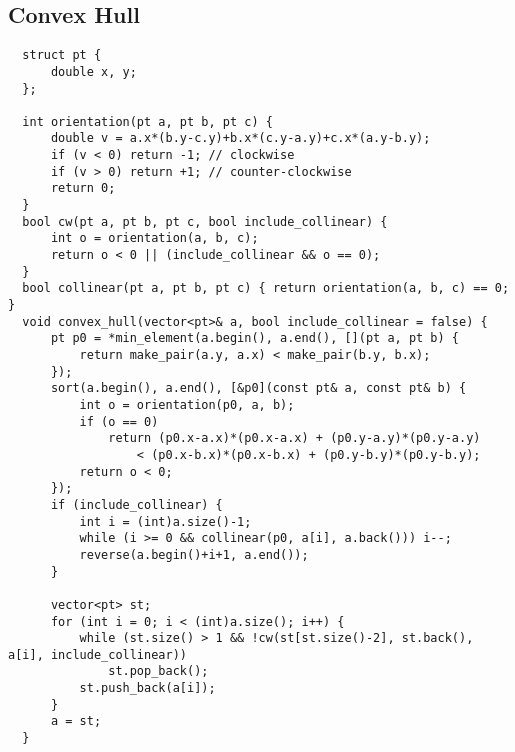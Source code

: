 \documentclass{article}
\begin{document}
\subsection{Convex Hull}
\begin{lstlisting}
  struct pt {
      double x, y;
  };

  int orientation(pt a, pt b, pt c) {
      double v = a.x*(b.y-c.y)+b.x*(c.y-a.y)+c.x*(a.y-b.y);
      if (v < 0) return -1; // clockwise
      if (v > 0) return +1; // counter-clockwise
      return 0;
  }
  bool cw(pt a, pt b, pt c, bool include_collinear) {
      int o = orientation(a, b, c);
      return o < 0 || (include_collinear && o == 0);
  }
  bool collinear(pt a, pt b, pt c) { return orientation(a, b, c) == 0; }
  void convex_hull(vector<pt>& a, bool include_collinear = false) {
      pt p0 = *min_element(a.begin(), a.end(), [](pt a, pt b) {
          return make_pair(a.y, a.x) < make_pair(b.y, b.x);
      });
      sort(a.begin(), a.end(), [&p0](const pt& a, const pt& b) {
          int o = orientation(p0, a, b);
          if (o == 0)
              return (p0.x-a.x)*(p0.x-a.x) + (p0.y-a.y)*(p0.y-a.y)
                  < (p0.x-b.x)*(p0.x-b.x) + (p0.y-b.y)*(p0.y-b.y);
          return o < 0;
      });
      if (include_collinear) {
          int i = (int)a.size()-1;
          while (i >= 0 && collinear(p0, a[i], a.back())) i--;
          reverse(a.begin()+i+1, a.end());
      }

      vector<pt> st;
      for (int i = 0; i < (int)a.size(); i++) {
          while (st.size() > 1 && !cw(st[st.size()-2], st.back(), a[i], include_collinear))
              st.pop_back();
          st.push_back(a[i]);
      }
      a = st;
  }
\end{lstlisting}
\end{document}
